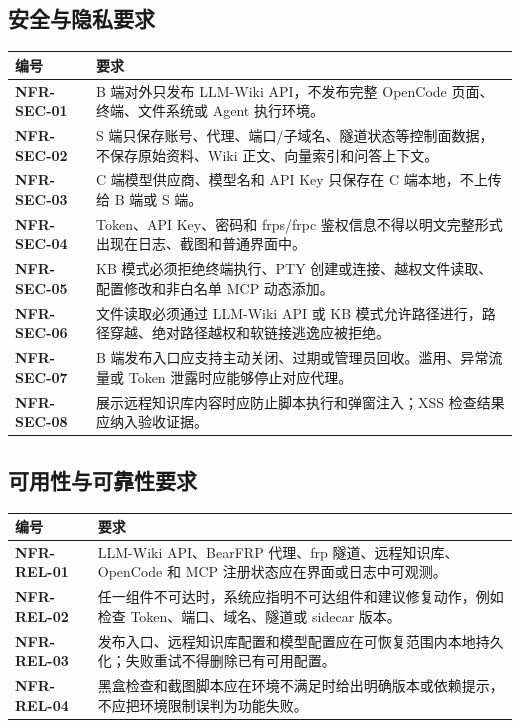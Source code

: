 \documentclass[UTF8,a4paper,12pt,fontset=fandol]{ctexart}
\begin{document}
\subsection{安全与隐私要求}
\begin{longtable}{>{\bfseries}p{3.0cm}p{11.2cm}}
\toprule
编号 & 要求 \\
\midrule
NFR-SEC-01 & B 端对外只发布 LLM-Wiki API，不发布完整 OpenCode 页面、终端、文件系统或 Agent 执行环境。 \\
NFR-SEC-02 & S 端只保存账号、代理、端口/子域名、隧道状态等控制面数据，不保存原始资料、Wiki 正文、向量索引和问答上下文。 \\
NFR-SEC-03 & C 端模型供应商、模型名和 API Key 只保存在 C 端本地，不上传给 B 端或 S 端。 \\
NFR-SEC-04 & Token、API Key、密码和 frps/frpc 鉴权信息不得以明文完整形式出现在日志、截图和普通界面中。 \\
NFR-SEC-05 & KB 模式必须拒绝终端执行、PTY 创建或连接、越权文件读取、配置修改和非白名单 MCP 动态添加。 \\
NFR-SEC-06 & 文件读取必须通过 LLM-Wiki API 或 KB 模式允许路径进行，路径穿越、绝对路径越权和软链接逃逸应被拒绝。 \\
NFR-SEC-07 & B 端发布入口应支持主动关闭、过期或管理员回收。滥用、异常流量或 Token 泄露时应能够停止对应代理。 \\
NFR-SEC-08 & 展示远程知识库内容时应防止脚本执行和弹窗注入；XSS 检查结果应纳入验收证据。 \\
\bottomrule
\end{longtable}

\subsection{可用性与可靠性要求}
\begin{longtable}{>{\bfseries}p{3.0cm}p{11.2cm}}
\toprule
编号 & 要求 \\
\midrule
NFR-REL-01 & LLM-Wiki API、BearFRP 代理、frp 隧道、远程知识库、OpenCode 和 MCP 注册状态应在界面或日志中可观测。 \\
NFR-REL-02 & 任一组件不可达时，系统应指明不可达组件和建议修复动作，例如检查 Token、端口、域名、隧道或 sidecar 版本。 \\
NFR-REL-03 & 发布入口、远程知识库配置和模型配置应在可恢复范围内本地持久化；失败重试不得删除已有可用配置。 \\
NFR-REL-04 & 黑盒检查和截图脚本应在环境不满足时给出明确版本或依赖提示，不应把环境限制误判为功能失败。 \\
\bottomrule
\end{longtable}
\end{document}
